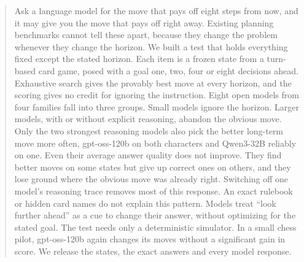 \begin{abstract}
Ask a language model for the move that pays off eight steps from now, and it may give you the move that pays off right away. Existing planning benchmarks cannot tell these apart, because they change the problem whenever they change the horizon. We built a test that holds everything fixed except the stated horizon. Each item is a frozen state from a turn-based card game, posed with a goal one, two, four or eight decisions ahead. Exhaustive search gives the provably best move at every horizon, and the scoring gives no credit for ignoring the instruction. Eight open models from four families fall into three groups. Small models ignore the horizon. Larger models, with or without explicit reasoning, abandon the obvious move. Only the two strongest reasoning models also pick the better long-term move more often, gpt-oss-120b on both characters and Qwen3-32B reliably on one. Even their average answer quality does not improve. They find better moves on some states but give up correct ones on others, and they lose ground where the obvious move was already right. Switching off one model's reasoning trace removes most of this response. An exact rulebook or hidden card names do not explain this pattern. Models treat ``look further ahead'' as a cue to change their answer, without optimizing for the stated goal. The test needs only a deterministic simulator. In a small chess pilot, gpt-oss-120b again changes its moves without a significant gain in score. We release the states, the exact answers and every model response.
\end{abstract}
